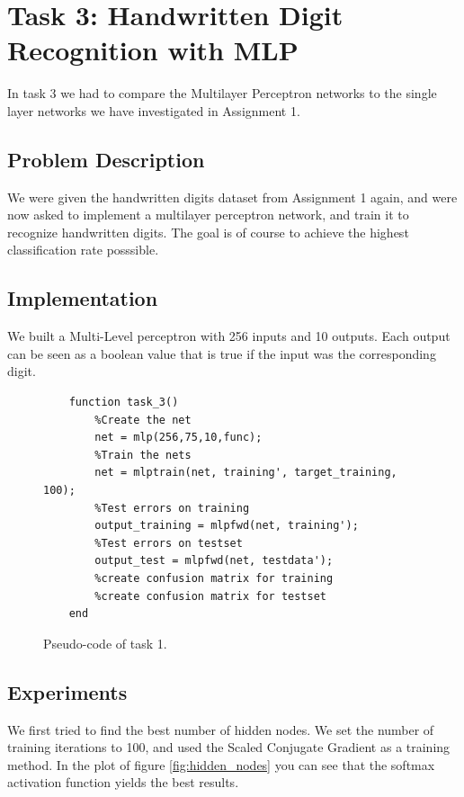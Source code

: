 \documentclass{article}
\begin{document}
\newpage
\section{Task 3: Handwritten Digit Recognition with MLP}
In task 3 we had to compare the Multilayer Perceptron networks to the single layer networks we have investigated in Assignment 1.

\subsection{Problem Description}
We were given the handwritten digits dataset from Assignment 1 again, and were now asked to implement a multilayer perceptron network, and train it to recognize handwritten digits.
The goal is of course to achieve the highest classification rate posssible.

\subsection{Implementation}
We built a Multi-Level perceptron with 256 inputs and 10 outputs. Each output can be seen as a boolean value that is true if the input was the corresponding digit.
\begin{figure}[H]
    \begin{verbatim}        
    function task_3()
        %Create the net
        net = mlp(256,75,10,func);
        %Train the nets
        net = mlptrain(net, training', target_training, 100);
        %Test errors on training
        output_training = mlpfwd(net, training');
        %Test errors on testset
        output_test = mlpfwd(net, testdata');
        %create confusion matrix for training
        %create confusion matrix for testset
    end
    \end{verbatim}
    \caption{Pseudo-code of task 1.}
    \label{fig:code}
\end{figure}

\newpage
\subsection{Experiments}
We first tried to find the best number of hidden nodes. We set the number of training iterations to 100, and used the Scaled Conjugate Gradient as a training method. In the plot of figure \ref{fig:hidden_nodes} you can see that the softmax activation function yields the best results.
\end{document}

